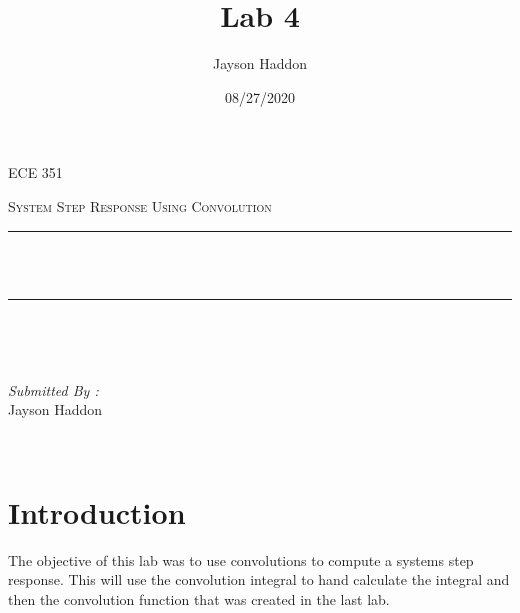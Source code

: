 \documentclass[11pt,a4]{report}
\title{Lab 4}
\author{Jayson Haddon}
\date{08/27/2020}
\makeatletter
\let\thetitle\@title
\makeatother
\begin{document}

\begin{titlepage}
	\centering
    \vspace*{0.5 cm}
\begin{center}    \textsc{\Large   ECE 351 }\\[2.0 cm]	\end{center}%
	\textsc{\Large System Step Response Using Convolution  }\\[0.5 cm]				%
	\rule{\linewidth}{0.2 mm} \\[0.4 cm]
	{ \huge \bfseries \thetitle}\\
	\rule{\linewidth}{0.2 mm} \\[1.5 cm]
	
	\begin{minipage}{0.4\textwidth}
		\begin{flushleft} \large
			\end{flushleft}
			\end{minipage}~
			\begin{minipage}{0.4\textwidth}
            
			\begin{flushright} \large
			\emph{Submitted By :} \\
			Jayson Haddon  
		\end{flushright}
           
	\end{minipage}\\[2 cm]
	
    
    
    
    
	
\end{titlepage}

\tableofcontents
\pagebreak

\renewcommand{\thesection}{\arabic{section}}
\section{Introduction}
The objective of this lab was to use convolutions to compute a systems step response. This will use the convolution integral to hand calculate the integral and then the  convolution function that was created in the last lab. 
\end{document}
